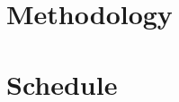 \documentclass[a4paper, 12pt]{article}
\begin{document}
\section{Methodology}



\section{Schedule}

\end{document}
